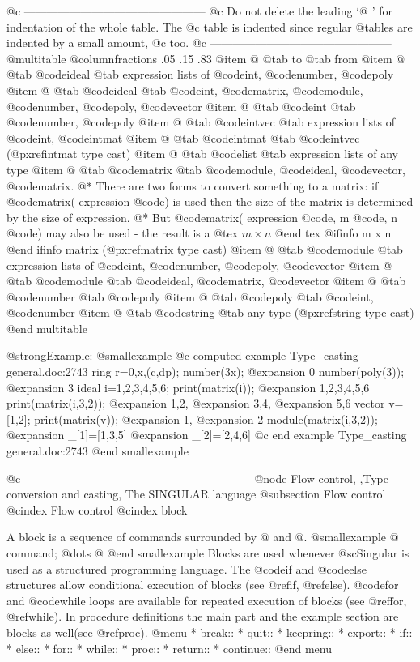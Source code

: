 {{{@c ------------------------------------------------
@c Do not delete the leading `@ ' for indentation of the whole table.  The
@c table is indented since regular @tables are indented by a small amount,
@c too.
@c ------------------------------------------------
@multitable @columnfractions .05 .15 .83
@item
@    @tab to @tab from
@item
@    @tab  @code{ideal} @tab  expression lists of @code{int}, @code{number}, @code{poly}
@item
@    @tab  @code{ideal} @tab  @code{int}, @code{matrix}, @code{module}, @code{number}, @code{poly}, @code{vector}
@item
@    @tab  @code{int} @tab    @code{number}, @code{poly}
@item
@    @tab  @code{intvec} @tab expression lists of @code{int}, @code{intmat}
@item
@    @tab  @code{intmat} @tab @code{intvec} (@pxref{intmat type cast})
@item
@    @tab  @code{list} @tab   expression lists of any type
@item
@    @tab  @code{matrix} @tab @code{module}, @code{ideal},
@code{vector}, @code{matrix}.
@* There are two forms to convert something to a matrix: if @code{matrix(}
expression @code{)} is used then the size of the matrix is determined
by the size of expression.
@* But @code{matrix(} expression @code{,} m @code{,} n @code{)} may also be
used - the result is a
@tex
$ m \times n $
@end tex
@ifinfo
m x n
@end ifinfo
matrix (@pxref{matrix type cast})
@item
@    @tab  @code{module} @tab expression lists of @code{int}, @code{number},
@code{poly}, @code{vector}
@item
@    @tab  @code{module} @tab @code{ideal}, @code{matrix}, @code{vector}
@item
@    @tab  @code{number} @tab @code{poly}
@item
@   @tab  @code{poly} @tab   @code{int}, @code{number}
@item
@   @tab  @code{string} @tab   any type (@pxref{string type cast})
@end multitable

@strong{Example:}
@smallexample
@c computed example Type_casting general.doc:2743 
  ring r=0,x,(c,dp);
  number(3x);
@expansion{} 0
  number(poly(3));
@expansion{} 3
  ideal i=1,2,3,4,5,6;
  print(matrix(i));
@expansion{} 1,2,3,4,5,6
  print(matrix(i,3,2));
@expansion{} 1,2,
@expansion{} 3,4,
@expansion{} 5,6 
  vector v=[1,2];
  print(matrix(v));
@expansion{} 1,
@expansion{} 2 
  module(matrix(i,3,2));
@expansion{} _[1]=[1,3,5]
@expansion{} _[2]=[2,4,6]
@c end example Type_casting general.doc:2743
@end smallexample


@c ------------------------------------------------------------
@node Flow control, ,Type conversion and casting, The SINGULAR language
@subsection Flow control
@cindex Flow control
@cindex block

A block is a sequence of commands surrounded by @{ and @}.
@smallexample
@{
   command;
   @dots{}
@}
@end smallexample
Blocks are used whenever @sc{Singular} is used as a structured programming
language. The @code{if} and @code{else} structures allow conditional
execution of blocks (see @ref{if}, @ref{else}). @code{for} and @code{while}
loops are available for repeated execution of blocks (see @ref{for},
@ref{while}).
In procedure definitions the main part and the example section are blocks
as well(see @ref{proc}).
@menu
* break::
* quit::
* keepring::
* export::
* if::
* else::
* for::
* while::
* proc::
* return::
* continue::
@end menu


}}}
